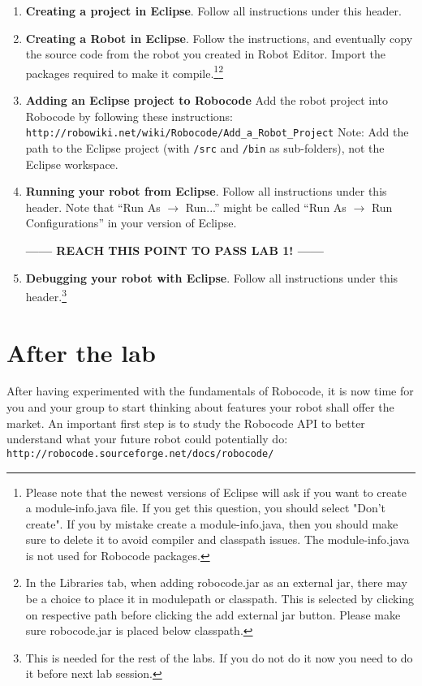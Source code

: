 \documentclass{scrreprt}
\begin{document}
\begin{enumerate}
\item \textbf{Creating a project in Eclipse}. Follow all instructions under this header.
\item \textbf{Creating a Robot in Eclipse}. Follow the instructions, and eventually copy the source code from the robot you created in Robot Editor. Import the packages required to make it compile.\footnote{Please note that the newest versions of Eclipse will ask if you want to create a module-info.java file. If you get this question, you should select "Don't create". 
If you by mistake create a module-info.java, then you should make sure to delete it to avoid compiler and classpath issues. The module-info.java is not used for Robocode packages.}\footnote{In the Libraries tab, when adding robocode.jar as an external jar, there may be a choice to place it in modulepath or classpath. This is selected by clicking on respective path before clicking the add external jar button. Please make sure robocode.jar is placed below classpath.}
\item \textbf{Adding an Eclipse project to Robocode} Add the robot project into Robocode by following these instructions:\\\texttt{http://robowiki.net/wiki/Robocode/Add\_a\_Robot\_Project} Note: Add the path to the Eclipse project (with \texttt{/src} and \texttt{/bin} as sub-folders), not the Eclipse workspace.
\item \textbf{Running your robot from Eclipse}. Follow all instructions under this header. Note that ``Run As $\rightarrow$ Run...'' might be called ``Run As $\rightarrow$ Run Configurations'' in your version of Eclipse.

\begin{center}
\textbf{------ REACH THIS POINT TO PASS LAB 1! ------}
\end{center}

\item \textbf{Debugging your robot with Eclipse}. Follow all instructions under this header.\footnote{This is needed for the rest of the labs. If you do not do it now you need to do it before next lab session.}
\end{enumerate}

\chapter{After the lab}
After having experimented with the fundamentals of Robocode, it is now time for you and your group to start thinking about features your robot shall offer the market. An important first step is to study the Robocode API to better understand what your future robot could potentially do: \texttt{http://robocode.sourceforge.net/docs/robocode/}
\end{document}
